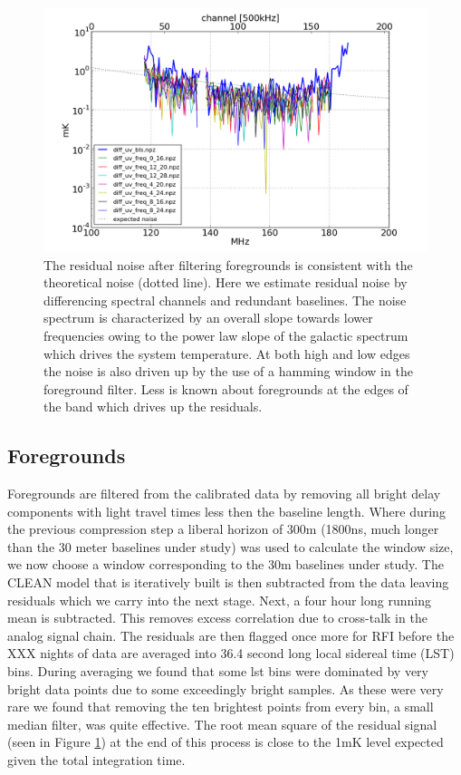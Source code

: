 \documentclass[preprint]{aastex}
\begin{document}
\begin{figure}
\centering
\includegraphics[width=\textwidth]{figures/trms_by_baseline.png}
\caption{\label{fig:noise} The residual noise after filtering foregrounds is consistent with the theoretical noise (dotted line).  Here we estimate residual noise by differencing spectral channels and redundant baselines. The noise spectrum is characterized by an overall slope towards lower frequencies owing to the power law slope of the galactic spectrum which drives the system temperature.  At both high and low edges the noise is also driven up by the use of a hamming window in the foreground filter. Less is known about foregrounds at the edges of the band which drives up the residuals.}
\end{figure}
\subsection{Foregrounds}
Foregrounds are filtered from the calibrated data by removing all bright delay components with light travel times less then the baseline length. Where during the previous compression step a liberal horizon of 300m (1800ns, much longer than the 30 meter baselines under study)  was used to calculate the window size, we now choose a window corresponding to the 30m baselines under study.  The CLEAN model that is iteratively built is then subtracted from the data leaving residuals which we carry into the next stage. Next, a four hour long running mean is subtracted. This removes excess correlation due to cross-talk in the analog signal chain. The residuals are then flagged once more for RFI before the XXX nights of data are averaged into 36.4 second long local sidereal time (LST) bins.  During averaging we found that some lst bins were dominated by very bright data points due to some exceedingly bright samples. As these were very rare we found that removing the ten brightest points from every bin, a small median filter, was quite effective.   The root mean square of the residual signal (seen in Figure \ref{fig:noise}) at the end of this process is close to the 1mK level expected given the total integration time.  
\end{document}
